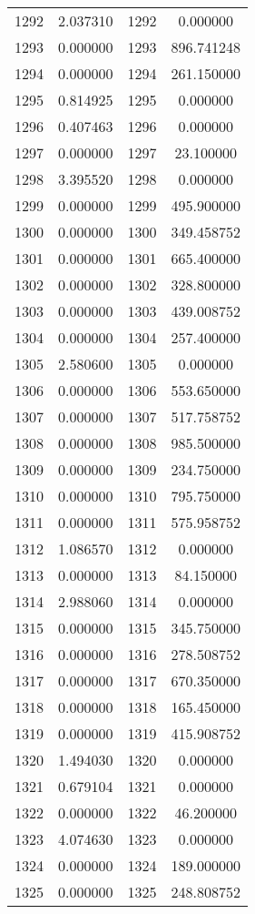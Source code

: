 \documentclass[12pt]{article}
\begin{document}
\begin{longtable}{@{}cccc@{}}
1292 & 2.037310 & 1292 & 0.000000 \\
1293 & 0.000000 & 1293 & 896.741248 \\
1294 & 0.000000 & 1294 & 261.150000 \\
1295 & 0.814925 & 1295 & 0.000000 \\
1296 & 0.407463 & 1296 & 0.000000 \\
1297 & 0.000000 & 1297 & 23.100000 \\
1298 & 3.395520 & 1298 & 0.000000 \\
1299 & 0.000000 & 1299 & 495.900000 \\
1300 & 0.000000 & 1300 & 349.458752 \\
1301 & 0.000000 & 1301 & 665.400000 \\
1302 & 0.000000 & 1302 & 328.800000 \\
1303 & 0.000000 & 1303 & 439.008752 \\
1304 & 0.000000 & 1304 & 257.400000 \\
1305 & 2.580600 & 1305 & 0.000000 \\
1306 & 0.000000 & 1306 & 553.650000 \\
1307 & 0.000000 & 1307 & 517.758752 \\
1308 & 0.000000 & 1308 & 985.500000 \\
1309 & 0.000000 & 1309 & 234.750000 \\
1310 & 0.000000 & 1310 & 795.750000 \\
1311 & 0.000000 & 1311 & 575.958752 \\
1312 & 1.086570 & 1312 & 0.000000 \\
1313 & 0.000000 & 1313 & 84.150000 \\
1314 & 2.988060 & 1314 & 0.000000 \\
1315 & 0.000000 & 1315 & 345.750000 \\
1316 & 0.000000 & 1316 & 278.508752 \\
1317 & 0.000000 & 1317 & 670.350000 \\
1318 & 0.000000 & 1318 & 165.450000 \\
1319 & 0.000000 & 1319 & 415.908752 \\
1320 & 1.494030 & 1320 & 0.000000 \\
1321 & 0.679104 & 1321 & 0.000000 \\
1322 & 0.000000 & 1322 & 46.200000 \\
1323 & 4.074630 & 1323 & 0.000000 \\
1324 & 0.000000 & 1324 & 189.000000 \\
1325 & 0.000000 & 1325 & 248.808752 \\

\end{longtable}
\end{document}
